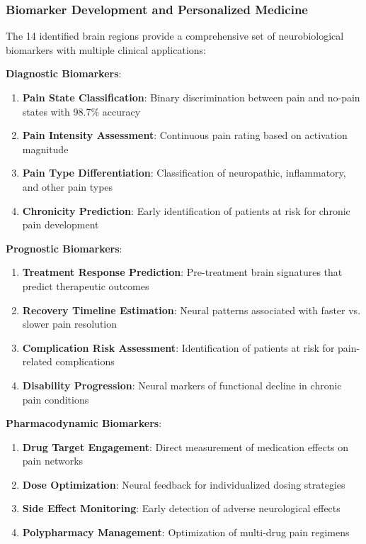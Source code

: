 \subsubsection{Biomarker Development and Personalized Medicine}

The 14 identified brain regions provide a comprehensive set of neurobiological biomarkers with multiple clinical applications:

\textbf{Diagnostic Biomarkers}:

\begin{enumerate}
\item \textbf{Pain State Classification}: Binary discrimination between pain and no-pain states with 98.7\% accuracy
\item \textbf{Pain Intensity Assessment}: Continuous pain rating based on activation magnitude
\item \textbf{Pain Type Differentiation}: Classification of neuropathic, inflammatory, and other pain types
\item \textbf{Chronicity Prediction}: Early identification of patients at risk for chronic pain development
\end{enumerate}

\textbf{Prognostic Biomarkers}:

\begin{enumerate}
\item \textbf{Treatment Response Prediction}: Pre-treatment brain signatures that predict therapeutic outcomes
\item \textbf{Recovery Timeline Estimation}: Neural patterns associated with faster vs. slower pain resolution
\item \textbf{Complication Risk Assessment}: Identification of patients at risk for pain-related complications
\item \textbf{Disability Progression}: Neural markers of functional decline in chronic pain conditions
\end{enumerate}

\textbf{Pharmacodynamic Biomarkers}:

\begin{enumerate}
\item \textbf{Drug Target Engagement}: Direct measurement of medication effects on pain networks
\item \textbf{Dose Optimization}: Neural feedback for individualized dosing strategies
\item \textbf{Side Effect Monitoring}: Early detection of adverse neurological effects
\item \textbf{Polypharmacy Management}: Optimization of multi-drug pain regimens
\end{enumerate}

